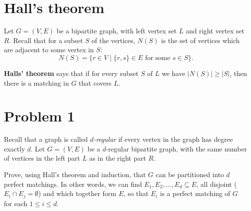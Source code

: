 \documentclass[12pt]{article}
\begin{document}



\section*{Hall's theorem}

Let $G=(V,E)$ be a bipartite graph, with left vertex set $L$ and right vertex set $R$.
Recall that for a subset $S$ of the vertices, $N(S)$ is the set of vertices which are adjacent to some vertex in $S$:
\[ N(S) = \{ r \in V \mid \{r, s\} \in E \text{ for some } s \in S \}. \]

\textbf{Halls' theorem} says that if for every subset $S$ of $L$ we have $|N(S)| \geq |S|$, then there is a matching in $G$ that covers $L$.

\section*{Problem 1}

Recall that a graph is called \emph{$d$-regular} if every vertex in the graph has degree exactly $d$.
Let $G=(V,E)$ be a $d$-regular bipartite graph, with the same number of vertices in the left part $L$ as in the right part $R$.

Prove, using Hall's theorem and induction, that $G$ can be partitioned into $d$ perfect matchings. In other words, we can find $E_1, E_2, \ldots, E_d \subseteq E$, all disjoint ($E_i \cap E_j = \emptyset$) and which together form $E$, so that $E_i$ is a perfect matching of $G$ for each $1 \leq i \leq d$.
\end{document}
